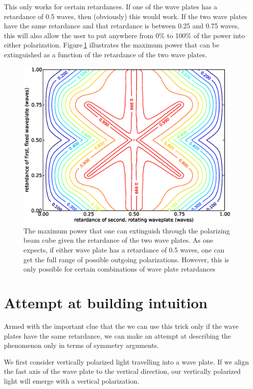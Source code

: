 This only works for certain retardances. If one of the wave plates has a retardance of 0.5 waves, then (obviously) this would work. If the two wave plates have the same retardance and that retardance is between 0.25 and 0.75 waves, this will also allow the user to put anywhere from 0\% to 100\% of the power into either polarization. Figure\,\ref{asymmetric} illustrates the maximum power that can be extinguished as a function of the retardance of the two wave plates.


\begin{figure}
    \centerline{\includegraphics{NewNotesAsymmetricFigure}}
    \caption[Maximum extinguished power for various combinations of retardances]{\label{asymmetric}
   The maximum power that one can extinguish through the polarizing beam cube given the retardance of the two wave plates. As one expects, if either wave plate has a retardance of 0.5 waves, one can get the full range of possible outgoing polarizations. However, this is only possible for certain combinations of wave plate retardances}
\end{figure}

\section{Attempt at building intuition}

Armed with the important clue that the we can use this trick only if the wave plates have the same retardance, we can make an attempt at describing the phenomenon only in terms of symmetry arguments.

We first consider vertically polarized light travelling into a wave plate. If we align the fast axis of the wave plate to the vertical direction, our vertically polarized light will emerge with a vertical polarization. 

